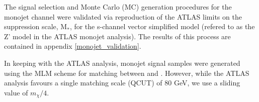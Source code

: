 \begin{flushleft}
The signal selection and Monte Carlo (MC) generation procedures for the monojet channel were validated via reproduction of the ATLAS limits on the suppression scale, M$_{*}$, for the s-channel vector simplified model (refered to as the Z' model in the ATLAS monojet analysis). The results of this process are contained in appendix \ref{monojet_validation}.
\bigskip

In keeping with the ATLAS analysis, monojet signal samples were generated using the MLM scheme for matching between \MG and \PYTHIA. However, while the ATLAS analysis favours a single matching scale (QCUT) of 80 GeV, we use a sliding value of $m_{\chi}/4$.   

%


\end{flushleft}

